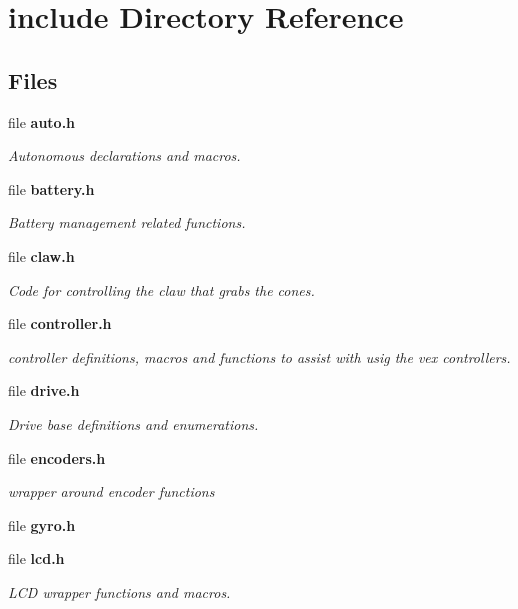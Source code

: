 \section{include Directory Reference}
\label{dir_d44c64559bbebec7f509842c48db8b23}
\subsection*{Files}
\begin{DoxyCompactItemize}
\item 
file \textbf{ auto.\+h}
\begin{DoxyCompactList}\small\item\em Autonomous declarations and macros. \end{DoxyCompactList}\item 
file \textbf{ battery.\+h}
\begin{DoxyCompactList}\small\item\em Battery management related functions. \end{DoxyCompactList}\item 
file \textbf{ claw.\+h}
\begin{DoxyCompactList}\small\item\em Code for controlling the claw that grabs the cones. \end{DoxyCompactList}\item 
file \textbf{ controller.\+h}
\begin{DoxyCompactList}\small\item\em controller definitions, macros and functions to assist with usig the vex controllers. \end{DoxyCompactList}\item 
file \textbf{ drive.\+h}
\begin{DoxyCompactList}\small\item\em Drive base definitions and enumerations. \end{DoxyCompactList}\item 
file \textbf{ encoders.\+h}
\begin{DoxyCompactList}\small\item\em wrapper around encoder functions \end{DoxyCompactList}\item 
file \textbf{ gyro.\+h}
\item 
file \textbf{ lcd.\+h}
\begin{DoxyCompactList}\small\item\em L\+CD wrapper functions and macros. \end{DoxyCompactList}\item 

\end{DoxyCompactItemize}

